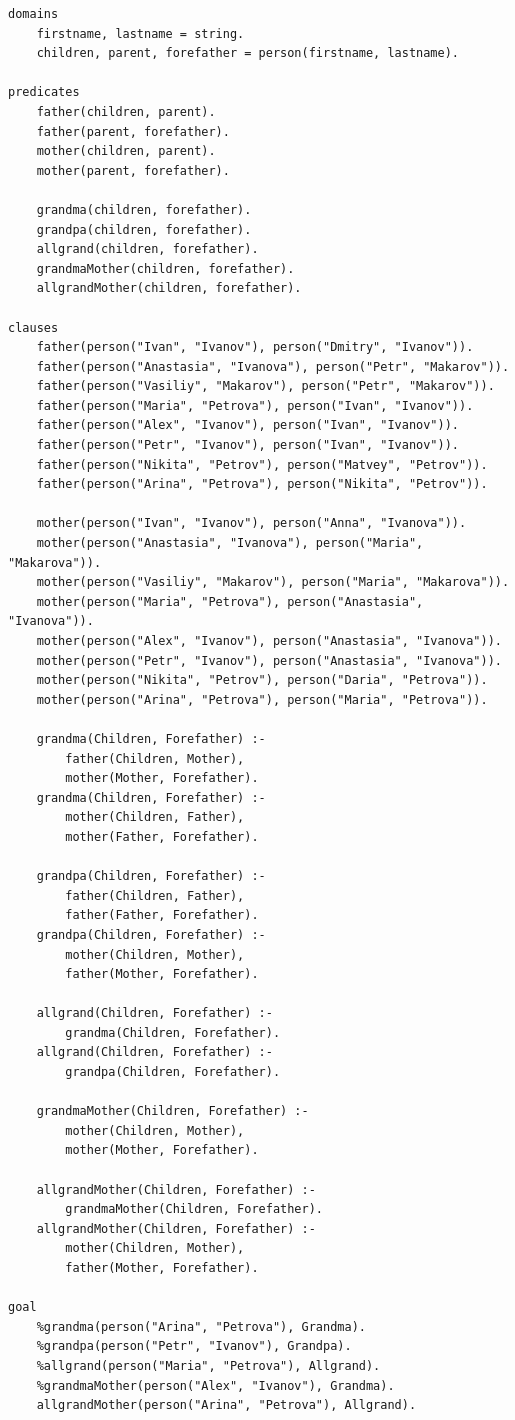 \begin{lstlisting}[caption=Текст программы]
domains
	firstname, lastname = string.
	children, parent, forefather = person(firstname, lastname).

predicates
	father(children, parent).
	father(parent, forefather).
	mother(children, parent).
	mother(parent, forefather).

	grandma(children, forefather).
	grandpa(children, forefather).
	allgrand(children, forefather).
	grandmaMother(children, forefather).
	allgrandMother(children, forefather).

clauses
	father(person("Ivan", "Ivanov"), person("Dmitry", "Ivanov")).
	father(person("Anastasia", "Ivanova"), person("Petr", "Makarov")).
	father(person("Vasiliy", "Makarov"), person("Petr", "Makarov")).
	father(person("Maria", "Petrova"), person("Ivan", "Ivanov")).
	father(person("Alex", "Ivanov"), person("Ivan", "Ivanov")).
	father(person("Petr", "Ivanov"), person("Ivan", "Ivanov")).
	father(person("Nikita", "Petrov"), person("Matvey", "Petrov")).
	father(person("Arina", "Petrova"), person("Nikita", "Petrov")).

	mother(person("Ivan", "Ivanov"), person("Anna", "Ivanova")).
	mother(person("Anastasia", "Ivanova"), person("Maria", "Makarova")).
	mother(person("Vasiliy", "Makarov"), person("Maria", "Makarova")).
	mother(person("Maria", "Petrova"), person("Anastasia", "Ivanova")).
	mother(person("Alex", "Ivanov"), person("Anastasia", "Ivanova")).
	mother(person("Petr", "Ivanov"), person("Anastasia", "Ivanova")).
	mother(person("Nikita", "Petrov"), person("Daria", "Petrova")).
	mother(person("Arina", "Petrova"), person("Maria", "Petrova")).

	grandma(Children, Forefather) :-
		father(Children, Mother),
		mother(Mother, Forefather).
	grandma(Children, Forefather) :-
		mother(Children, Father),
		mother(Father, Forefather).

	grandpa(Children, Forefather) :-
		father(Children, Father),
		father(Father, Forefather).
	grandpa(Children, Forefather) :-
		mother(Children, Mother),
		father(Mother, Forefather).

	allgrand(Children, Forefather) :-
		grandma(Children, Forefather).
	allgrand(Children, Forefather) :-
		grandpa(Children, Forefather).

	grandmaMother(Children, Forefather) :-
		mother(Children, Mother),
		mother(Mother, Forefather).

	allgrandMother(Children, Forefather) :-
		grandmaMother(Children, Forefather).
	allgrandMother(Children, Forefather) :-
		mother(Children, Mother),
		father(Mother, Forefather).

goal
	%grandma(person("Arina", "Petrova"), Grandma).
	%grandpa(person("Petr", "Ivanov"), Grandpa).
	%allgrand(person("Maria", "Petrova"), Allgrand).
	%grandmaMother(person("Alex", "Ivanov"), Grandma).
	allgrandMother(person("Arina", "Petrova"), Allgrand).
\end{lstlisting}

